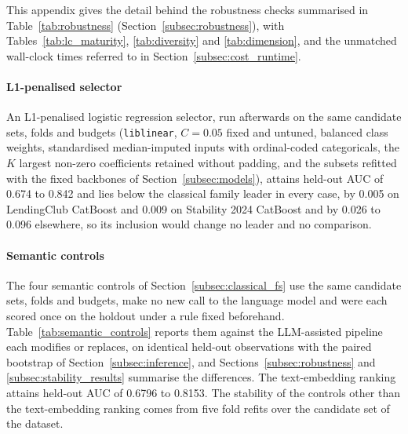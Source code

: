 \documentclass[final,5p,twocolumn]{elsarticle}
\newcommand{\Kfeat}{K}
\begin{document}
This appendix gives the detail behind the robustness checks summarised in Table~\ref{tab:robustness} (Section~\ref{subsec:robustness}), with Tables~\ref{tab:lc_maturity}, \ref{tab:diversity} and \ref{tab:dimension}, and the unmatched wall-clock times referred to in Section~\ref{subsec:cost_runtime}.

\paragraph{L1-penalised selector}
An L1-penalised logistic regression selector, run afterwards on the same candidate sets, folds and budgets (\texttt{liblinear}, $C=0.05$ fixed and untuned, balanced class weights, standardised median-imputed inputs with ordinal-coded categoricals, the $\Kfeat$ largest non-zero coefficients retained without padding, and the subsets refitted with the fixed backbones of Section~\ref{subsec:models}), attains held-out AUC of 0.674 to 0.842 and lies below the classical family leader in every case, by 0.005 on LendingClub CatBoost and 0.009 on Stability 2024 CatBoost and by 0.026 to 0.096 elsewhere, so its inclusion would change no leader and no comparison.

\paragraph{Semantic controls}
The four semantic controls of Section~\ref{subsec:classical_fs} use the same candidate sets, folds and budgets, make no new call to the language model and were each scored once on the holdout under a rule fixed beforehand. Table~\ref{tab:semantic_controls} reports them against the LLM-assisted pipeline each modifies or replaces, on identical held-out observations with the paired bootstrap of Section~\ref{subsec:inference}, and Sections~\ref{subsec:robustness} and \ref{subsec:stability_results} summarise the differences. The text-embedding ranking attains held-out AUC of 0.6796 to 0.8153. The stability of the controls other than the text-embedding ranking comes from five fold refits over the candidate set of the dataset.
\end{document}
